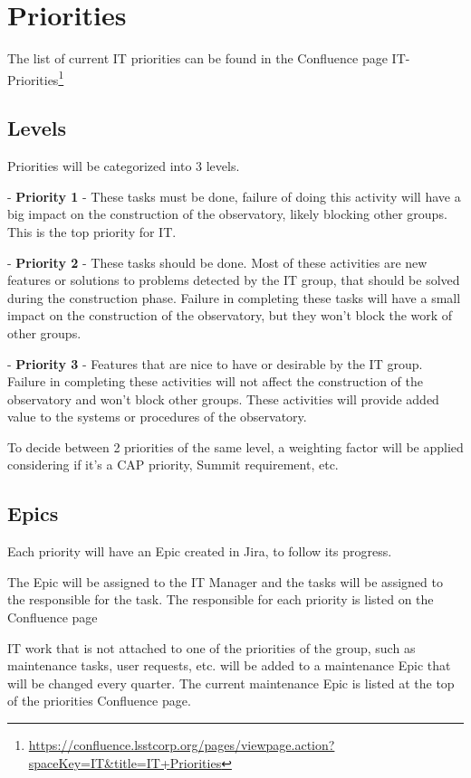 \section{Priorities}


The list of current IT priorities can be found in the Confluence page IT-Priorities\footnote{\url{https://confluence.lsstcorp.org/pages/viewpage.action?spaceKey=IT&title=IT+Priorities}}

\subsection{Levels }

Priorities will be categorized into 3 levels.

  - {\bf Priority 1} - These tasks must be done, failure of doing this activity will have a big impact on the construction of the observatory, likely blocking other groups. This is the top priority for IT.

  - {\bf Priority 2} - These tasks should be done. Most of these activities are new features or solutions to problems detected by the IT group, that should be solved during the construction phase. Failure in completing these tasks will have a small impact on the construction of the observatory, but they won't block the work of other groups.

  - {\bf Priority 3} - Features that are nice to have or desirable by the IT group. Failure in completing these activities will not affect the construction of the observatory and won't block other groups. These activities will provide added value to the systems or procedures of the observatory.

To decide between 2 priorities of the same level, a weighting factor will be applied considering if it's a CAP priority, Summit requirement, etc.

\subsection{Epics }

Each priority will have an Epic created in Jira, to follow its progress.

The Epic will be assigned to the IT Manager and the tasks will be assigned to the responsible for the task. The responsible for each priority is listed on the Confluence page

IT work that is not attached to one of the priorities of the group, such as maintenance tasks, user requests, etc. will be added to a maintenance Epic that will be changed every quarter. The current maintenance Epic is listed at the top of the priorities Confluence page.

